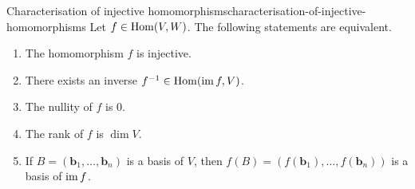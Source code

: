 \begin{corollary}{Characterisation of injective homomorphisms}{characterisation-of-injective-homomorphisms}
 Let $f \in \operatorname{Hom}(V,W)$. The following statements are equivalent.
 \begin{enumerate}[label=(\alph*)]
  \item The homomorphism $f$ is injective.
  \item There exists an inverse $f^{-1} \in \operatorname{Hom}(\operatorname{im} f, V)$.
  \item The nullity of $f$ is $0$.
  \item The rank of $f$ is $\dim V$.
  \item If $B = (\mathbf{b}_1,\ldots,\mathbf{b}_n)$ is a basis of $V$, then
   $f(B) = (f(\mathbf{b}_1),\ldots,f(\mathbf{b}_n))$ is a basis of $\operatorname{im} f$.
 \end{enumerate}
\end{corollary}
